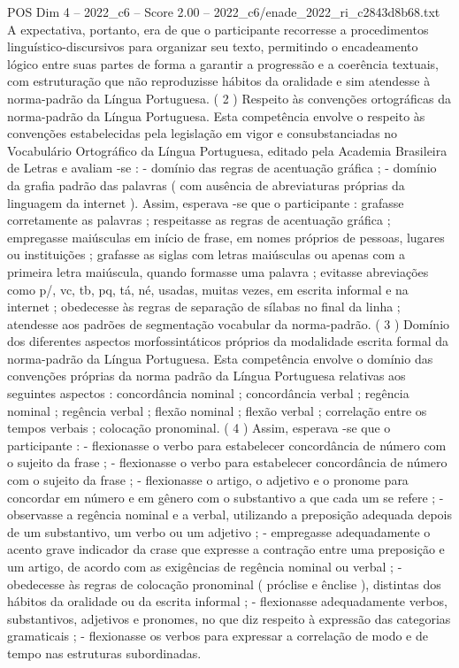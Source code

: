 \begin{textsample}{POS Dim 4 – 2022\_c6 – Score 2.00 – 2022\_c6/enade\_2022\_ri\_c2843d8b68.txt}
A expectativa, portanto, era de que o participante recorresse a procedimentos linguístico-discursivos para organizar seu texto, permitindo o encadeamento lógico entre suas partes de forma a garantir a progressão e a coerência textuais, com estruturação que não reproduzisse hábitos da oralidade e sim atendesse à norma-padrão da Língua Portuguesa. ( 2 ) Respeito às convenções ortográficas da norma-padrão da Língua Portuguesa.
Esta competência envolve o respeito às convenções estabelecidas pela legislação em vigor e consubstanciadas no Vocabulário Ortográfico da Língua Portuguesa, editado pela Academia Brasileira de Letras e avaliam -se : - domínio das regras de acentuação gráfica ; - domínio da grafia padrão das palavras ( com ausência de abreviaturas próprias da linguagem da internet ).
Assim, esperava -se que o participante : grafasse corretamente as palavras ; respeitasse as regras de acentuação gráfica ; empregasse maiúsculas em início de frase, em nomes próprios de pessoas, lugares ou instituições ; grafasse as siglas com letras maiúsculas ou apenas com a primeira letra maiúscula, quando formasse uma palavra ; evitasse abreviações como p/, vc, tb, pq, tá, né, usadas, muitas vezes, em escrita informal e na internet ; obedecesse às regras de separação de sílabas no final da linha ; atendesse aos padrões de segmentação vocabular da norma-padrão. ( 3 ) Domínio dos diferentes aspectos morfossintáticos próprios da modalidade escrita formal da norma-padrão da Língua Portuguesa.
Esta competência envolve o domínio das convenções próprias da norma padrão da Língua Portuguesa relativas aos seguintes aspectos : concordância nominal ; concordância verbal ; regência nominal ; regência verbal ; flexão nominal ; flexão verbal ; correlação entre os tempos verbais ; colocação pronominal. ( 4 ) Assim, esperava -se que o participante : - flexionasse o verbo para estabelecer concordância de número com o sujeito da frase ; - flexionasse o verbo para estabelecer concordância de número com o sujeito da frase ; - flexionasse o artigo, o adjetivo e o pronome para concordar em número e em gênero com o substantivo a que cada um se refere ; - observasse a regência nominal e a verbal, utilizando a preposição adequada depois de um substantivo, um verbo ou um adjetivo ; - empregasse adequadamente o acento grave indicador da crase que expresse a contração entre uma preposição e um artigo, de acordo com as exigências de regência nominal ou verbal ; - obedecesse às regras de colocação pronominal ( próclise e ênclise ), distintas dos hábitos da oralidade ou da escrita informal ; - flexionasse adequadamente verbos, substantivos, adjetivos e pronomes, no que diz respeito à expressão das categorias gramaticais ; - flexionasse os verbos para expressar a correlação de modo e de tempo nas estruturas subordinadas.

\end{textsample}
